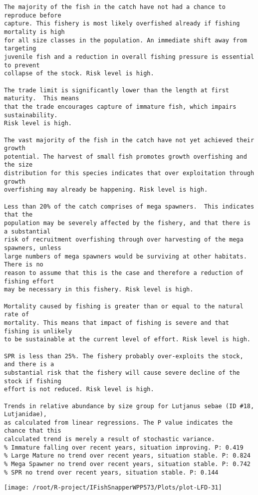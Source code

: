 \documentclass{report}\usepackage[]{graphicx}\usepackage[]{color}
\makeatletter
\def\maxwidth{ %
  \ifdim\Gin@nat@width>\linewidth
    \linewidth
  \else
    \Gin@nat@width
  \fi
}
\newenvironment{kframe}{%
 \def\at@end@of@kframe{}%
 \ifinner\ifhmode%
  \def\at@end@of@kframe{\end{minipage}}%
  \begin{minipage}{\columnwidth}%
 \fi\fi%
 \def\FrameCommand##1{\hskip\@totalleftmargin \hskip-\fboxsep
 \colorbox{shadecolor}{##1}\hskip-\fboxsep
     \hskip-\linewidth \hskip-\@totalleftmargin \hskip\columnwidth}%
 \MakeFramed {\advance\hsize-\width
   \@totalleftmargin\z@ \linewidth\hsize
   \@setminipage}}%
 {\par\unskip\endMakeFramed%
 \at@end@of@kframe}
\newenvironment{knitrout}{}{} %
\makeatother
\begin{document}
\begin{knitrout}
\begin{kframe}
\begin{verbatim}
The majority of the fish in the catch have not had a chance to reproduce before
capture. This fishery is most likely overfished already if fishing mortality is high
for all size classes in the population. An immediate shift away from targeting
juvenile fish and a reduction in overall fishing pressure is essential to prevent
collapse of the stock. Risk level is high.

The trade limit is significantly lower than the length at first maturity.  This means
that the trade encourages capture of immature fish, which impairs sustainability.
Risk level is high.

The vast majority of the fish in the catch have not yet achieved their growth
potential. The harvest of small fish promotes growth overfishing and the size
distribution for this species indicates that over exploitation through growth
overfishing may already be happening. Risk level is high.

Less than 20% of the catch comprises of mega spawners.  This indicates that the
population may be severely affected by the fishery, and that there is a substantial
risk of recruitment overfishing through over harvesting of the mega spawners, unless
large numbers of mega spawners would be surviving at other habitats. There is no
reason to assume that this is the case and therefore a reduction of fishing effort
may be necessary in this fishery. Risk level is high.
 
Mortality caused by fishing is greater than or equal to the natural rate of
mortality. This means that impact of fishing is severe and that fishing is unlikely
to be sustainable at the current level of effort. Risk level is high.
 
SPR is less than 25%. The fishery probably over-exploits the stock, and there is a
substantial risk that the fishery will cause severe decline of the stock if fishing
effort is not reduced. Risk level is high.
 
Trends in relative abundance by size group for Lutjanus sebae (ID #18, Lutjanidae),
as calculated from linear regressions. The P value indicates the chance that this
calculated trend is merely a result of stochastic variance.
% Immature falling over recent years, situation improving. P: 0.419
% Large Mature no trend over recent years, situation stable. P: 0.824
% Mega Spawner no trend over recent years, situation stable. P: 0.742
% SPR no trend over recent years, situation stable. P: 0.144
\end{verbatim}
\end{kframe}
\texttt{[image: /root/R-project/IFishSnapperWPP573/Plots/plot-LFD-31]} 


\end{knitrout}
\end{document}
